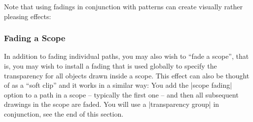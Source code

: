 Note that using fadings in conjunction with patterns can create visually rather
pleasing effects:
%
\begin{codeexample}[]
\tikzfading[name=middle,
            top color=transparent!50,
            bottom color=transparent!50,
            middle color=transparent!20]
\end{codeexample}


\subsubsection{Fading a Scope}

In addition to fading individual paths, you may also wish to ``fade a scope'',
that is, you may wish to install a fading that is used globally to specify the
transparency for all objects drawn inside a scope. This effect can also be
thought of as a ``soft clip'' and it works in a similar way: You add the
|scope fading| option to a path in a scope -- typically the first one -- and
then all subsequent drawings in the scope are faded. You will use a
|transparency group| in conjunction, see the end of this section.

